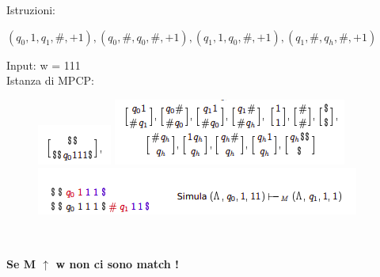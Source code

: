 Istruzioni:
\begin{center}
    $(q_0, 1, q_1, \#, +1), (q_0, \#, q_0, \#, +1), (q_1, 1, q_0, \#, +1), (q_1, \#, q_h , \#, +1)$
\end{center}
Input: w = 111\\
Istanza di MPCP:
\begin{figure}[htp]
    \centering
    \includegraphics[scale=0.8]{tesi_stile/img/cap7f10.png}
    \includegraphics[scale=0.8]{tesi_stile/img/cap7f11.png}
    \includegraphics[scale=0.8]{tesi_stile/img/cap7f12.png}
\end{figure}\\
\begin{center}
    \textbf{Se M $\uparrow$ w non ci sono match !}
\end{center}
\newpage
